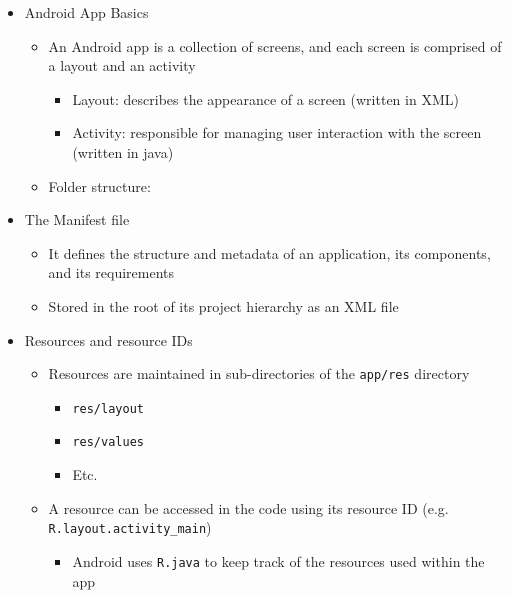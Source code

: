 \begin{itemize}
	\item Android App Basics
	\begin{itemize}
		\item An Android app is a collection of screens, and each screen is comprised of a layout and an activity
		\begin{itemize}
			\item Layout: describes the appearance of a screen (written in XML)
			\item Activity: responsible for managing user interaction with the screen (written in java)
		\end{itemize}
		\item Folder structure:
	\end{itemize}
	\item The Manifest file
	\begin{itemize}
		\item It defines the structure and metadata of an application, its components, and its requirements
		\item Stored in the root of its project hierarchy as an XML file
	\end{itemize}

	\item Resources and resource IDs
	\begin{itemize}
		\item Resources are maintained in sub-directories of the \Verb|app/res| directory
		\begin{itemize}
			\item \Verb|res/layout|
			\item \Verb|res/values|
			\item Etc.
		\end{itemize}
		\item A resource can be accessed in the code using its resource ID (e.g. \Verb|R.layout.activity_main|)
		\begin{itemize}
			\item Android uses \Verb|R.java| to keep track of the resources used within the app
		\end{itemize}
	\end{itemize}


\end{itemize}

